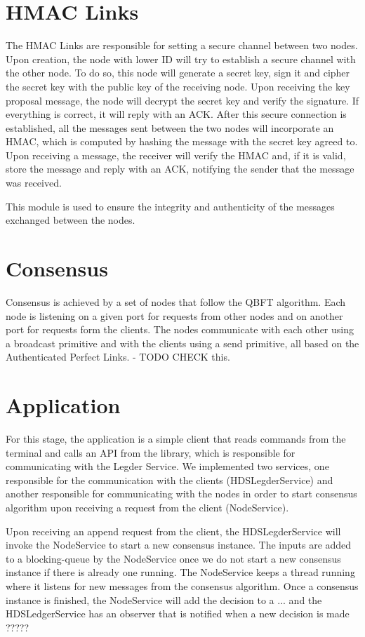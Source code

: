 \documentclass{article}
\begin{document}
\section{HMAC Links}
The HMAC Links are responsible for setting a secure channel between two nodes. Upon creation, 
the node with lower ID will try to establish a secure channel with the other node. To do so, 
this node will generate a secret key, sign it and cipher the secret key with the public key of 
the receiving node. Upon receiving the key proposal message, the node will decrypt the secret 
key and verify the signature. If everything is correct, it will reply with an ACK. After this 
secure connection is established, all the messages sent between the two nodes will incorporate 
an HMAC, which is computed by hashing the message with the secret key agreed to. Upon receiving 
a message, the receiver will verify the HMAC and, if it is valid, store the message and reply 
with an ACK, notifying the sender that the message was received.

This module is used to ensure the integrity and authenticity of the messages exchanged between 
the nodes.

\section{Consensus}
Consensus is achieved by a set of nodes that follow the QBFT algorithm. Each node is listening 
on a given port for requests from other nodes and on another port for requests form the clients. 
The nodes communicate with each other using a broadcast primitive and with the clients using a send 
primitive, all based on the Authenticated Perfect Links. - TODO CHECK this.

\section{Application}
For this stage, the application is a simple client that reads commands from the terminal and calls 
an API from the library, which is responsible for communicating with the Legder Service. We implemented 
two services, one responsible for the communication with the clients (HDSLegderService) and another responsible 
for communicating with the nodes in order to start consensus algorithm upon receiving a request from the client 
(NodeService). 

Upon receiving an append request from the client, the HDSLegderService will invoke the NodeService to start a new 
consensus instance. The inputs are added to a blocking-queue by the NodeService once we do not start a new consensus 
instance if there is already one running. The NodeService keeps a thread running where it listens for new messages 
from the consensus algorithm. Once a consensus instance is finished, the NodeService will add the decision to a 
... and the HDSLedgerService has an observer that is notified when a new decision is made ?????
\end{document}
